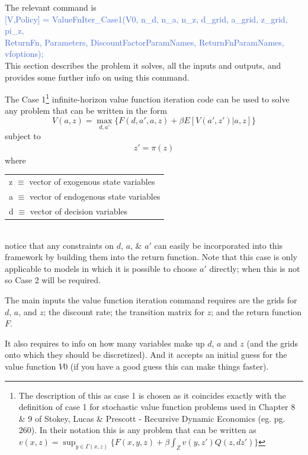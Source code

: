 The relevant command is \\
\textcolor{RoyalBlue}{[V,Policy] = ValueFnIter\_{}Case1(V0, n\_{}d, n\_{}a, n\_{}z, d\_{}grid, a\_{}grid, z\_{}grid, pi\_{}z, } \\
\indent \indent \textcolor{RoyalBlue}{ReturnFn, Parameters, DiscountFactorParamNames, ReturnFnParamNames, vfoptions);} \\
This section describes the problem it solves, all the inputs and outputs, and provides some further info on using this command.

The Case 1\footnote{The description of this as case 1 is chosen as it coincides exactly with the definition of case 1 for stochastic
value function problems used in Chapter 8 \& 9 of Stokey, Lucas \& Prescott - Recursive Dynamic Economics (eg. pg. 260). In their
notation this is any problem that can be written as $\textit{v}(x,z)=\sup_{y\in \Gamma(x,z)} \{ F(x,y,z) + \beta \int_Z
\textit{v}(y,z')Q(z,dz')\}$} infinite-horizon value function iteration code can be used to solve any problem that
can be written in the form
\begin{equation*}
 V(a,z)= \max_{d,a'} \{ F(d,a',a,z) + \beta E[V(a',z')|a,z] \}
\end{equation*}
subject to
\begin{eqnarray*}
 z'=\pi(z)
\end{eqnarray*}
where \\
\begin{tabular} {l}
 z $\equiv$ vector of exogenous state variables \\
 a $\equiv$ vector of endogenous state variables \\
 d $\equiv$ vector of decision variables
\end{tabular} \\
notice that any constraints on $d$, $a$, \& $a'$ can easily be incorporated into this framework by building them into the return function. Note that this
case is only applicable to models in which it is possible to choose $a'$ directly; when this is not so Case 2 will be required.

The main inputs the value function iteration command requires are the grids for $d$, $a$, and $z$; the discount rate; the transition matrix for $z$; and the
return function $F$.

It also requires to info on how many variables make up $d$, $a$ and $z$ (and the grids onto which they should be discretized).
And it accepts an initial
guess for the value function $V0$ (if you have a good guess this can make things faster).

